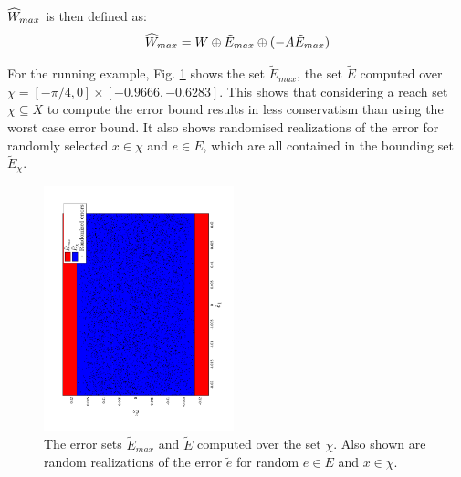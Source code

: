 $\widehat{W}_{max}$ is then defined as:
\begin{equation}
\widehat{W}_{max} = W \oplus \tilde{E}_{max} \oplus (-A\tilde{E}_{max})
\end{equation}

For the running example, Fig. \ref{fig:err_bound_toy} shows the set $\tilde{E}_{max}$, the set $\tilde{E}$ computed over $\chi = [-\pi/4,0]\times[-0.9666,-0.6283]$. This shows that considering a reach set $\chi \subseteq X$ to compute the error bound results in less conservatism than using the worst case error bound. It also shows randomised realizations of the error for randomly selected $x \in \chi$ and $e \in E$, which are all contained in the bounding set $\tilde{E}_{\chi}$.

\begin{figure}
\includegraphics[angle=270,width=0.49\textwidth]{figs/Err_Bounds_toy.pdf}
\caption{The error sets $\tilde{E}_{max}$ and $\tilde{E}$ computed over the set $\chi$. Also shown are random realizations of the error $\tilde{e}$ for random $e \in E$ and $x \in \chi$.}
\label{fig:err_bound_toy}
\end{figure}

